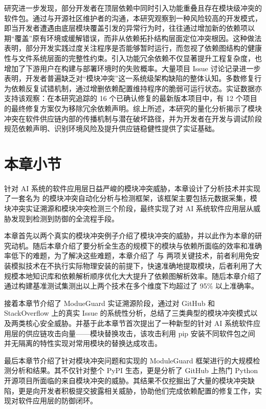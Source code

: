 研究进一步发现，部分开发者在顶层依赖中同时引入功能重叠且存在模块级冲突的软件包。通过与开源社区维护者的沟通，本研究观察到一种风险较高的开发模式，即当开发者遭遇由底层模块覆盖引发的异常行为时，往往通过增加新的依赖项以期“覆盖”原有环境或缓解错误，而非从依赖拓扑结构层面定位冲突根因。这种做法表明，部分开发实践过度关注程序是否能够暂时运行，而忽视了依赖图结构的健康性与文件系统层面的完整性约束。引入功能冗余依赖不仅显著提升工程复杂度，也增加了下游用户在构建与部署环境时的失败概率。大量项目 Issue 讨论记录进一步表明，开发者普遍缺乏对“模块冲突”这一系统级架构缺陷的整体认知。多数修复行为依赖反复试错机制，通过增删依赖配置维持程序的脆弱可运行状态。实证数据亦支持该观察：在本研究追踪的 16 个已确认修复的最新版本项目中，有 12 个项目的最终修复方案仅为移除冗余依赖声明。综上所述，本研究的量化分析揭示了模块冲突在软件供应链内部的传播机制与潜在破坏路径，并为开发者在开发与调试阶段规范依赖声明、识别环境风险及提升供应链稳健性提供了实证基础。

\section{本章小节}
针对 AI 系统的软件应用层日益严峻的模块冲突威胁，本章设计了分析技术并实现了一套名为  的模块冲突自动化分析与检测框架，该框架主要包括元数据采集，模块冲突实证溯源和模块冲突检测三个阶段，最终实现了对 AI 系统软件应用层从威胁发现到检测到防御的全流程手段。

本章首先以两个真实的模块冲突例子介绍了模块冲突的威胁，并以此作为本章的研究动机。随后本章介绍了要分析全生态的规模下的模块与依赖所面临的效率和准确率低下的难题，为了解决这些难题，本章介绍了 与  两项关键技术，前者利用免安装模拟技术在不执行实际物理安装的前提下，快速准确地提取模块，后者利用了大规模本地知识库和依赖解析顺序优化大大提升了依赖图解析效率。随后本章介绍了通过构建基准测试集测出以上两个技术在多个维度下均超过了 95\% 以上准确率。

接着本章节介绍了 ModueGuard 实证溯源阶段，通过对 GitHub 和 StackOverflow 上的真实 Issue 的系统性分析，总结了三类典型的模块冲突模式以及两类核心安全威胁。并基于此本章节首次提出了一种新型的针对 AI 系统软件应用层的供应链攻击向量——模块替换攻击，该攻击利用 pip 安装不同软件包之间并无隔离的特性实现对常用模块的替换达成攻击。

最后本章节介绍了针对模块冲突问题和实现的 ModuleGuard 框架进行的大规模检测分析和结果。其不仅针对整个 PyPI 生态，更是分析了 GitHub 上热门 Python 开源项目所面临的来自模块冲突的威胁。其结果不仅挖掘出了大量的模块冲突缺陷，更是向开发者积极提交披露相关威胁，协助他们完成依赖配置的修复工作，实现对软件应用层的防御闭环。


